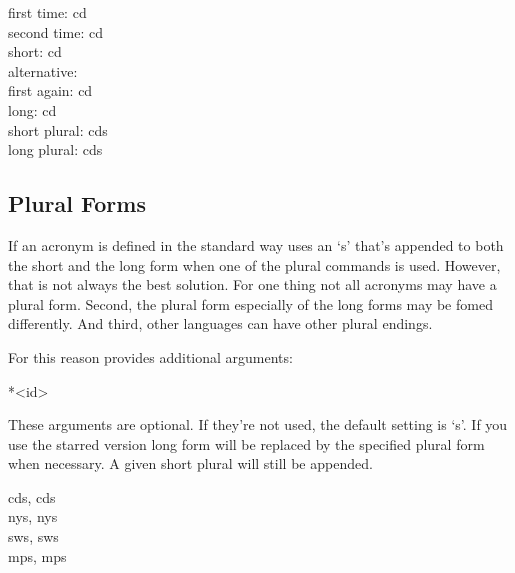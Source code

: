 \documentclass[DIV10,toc=index,toc=bib]{cnpkgdoc}
\begin{document}
\begin{beispiel}
 first time: \ac{cd} \\
 second time: \ac{cd} \\
 short: \acs{cd} \\
 alternative:  \\
 first again: \acf{cd} \\
 long: \acl{cd} \\
 short plural: \acsp{cd} \\
 long plural: \aclp{cd}
\end{beispiel}

\subsection{Plural Forms}
If an acronym is defined in the standard way \acro uses an `s' that's appended to
both the short and the long form when one of the plural commands is used. However,
that is not always the best solution. For one thing not all acronyms may have a
plural form. Second, the plural form especially of the long forms may be fomed
differently. And third, other languages can have other plural endings.

For this reason  provides additional arguments:
\begin{beschreibung}
 *{<id>}
\end{beschreibung}
These arguments are optional. If they're not used, the default setting is `s'.
If you use the starred version long form will be replaced by the specified plural
form when necessary. A given short plural will still be appended.

\begin{beispiel}
 \acsp{cd}, \aclp{cd} \\
 \acsp{ny}, \aclp{ny} \\
 \acsp{sw}, \aclp{sw} \\
 \acsp{mp}, \aclp{mp}
\end{beispiel}
\end{document}
